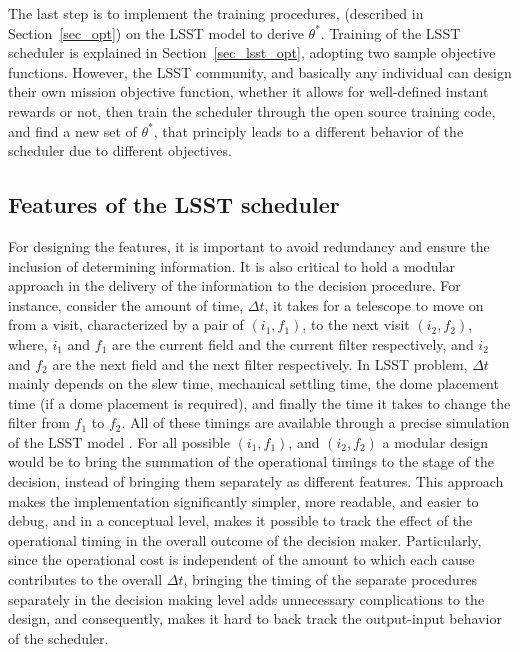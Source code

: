 \documentclass[12pt]{aastex62}
\theoremstyle{definition}
\begin{document}
The last step is to implement the training procedures, (described in Section~\ref{sec_opt}) on the LSST model to derive $\theta^*$. Training of the LSST scheduler is explained in Section~\ref{sec_lsst_opt}, adopting two sample objective functions. However, the LSST community, and basically any individual can design their own mission objective function, whether it allows for well-defined instant rewards or not, then train the scheduler through the open source training code, and find a new set of $\theta^*$, that principly leads to a different behavior of the scheduler due to different objectives.


\subsection{Features of the LSST scheduler}\label{sec_lsst_features}

For designing the features, it is important to avoid redundancy and ensure the inclusion of determining information. It is also critical to hold a modular approach in the delivery of the information to the decision procedure. For instance, consider the amount of time, $\Delta t$, it takes for a telescope to move on from a visit, characterized by a pair of $(i_1,f_1)$, to the next visit $(i_2,f_2)$,  where, $i_1$ and $f_1$ are the current field and the current filter respectively, and $i_2$ and $f_2$ are the next field and the next filter respectively. In LSST problem, $\Delta t$ mainly depends on the slew time, mechanical settling time, the dome placement time (if a dome placement is required), and finally the time it takes to change the filter from $f_1$ to $f_2$. All of these timings are available through a precise simulation of the LSST model \citep{delgado2014lsst}. For all possible $(i_1,f_1)$, and $(i_2,f_2)$ a modular design would be to bring the summation of the operational timings to the stage of the decision, instead of bringing them separately as different features. This approach makes the implementation significantly simpler, more readable, and easier to debug, and in a conceptual level, makes it possible to track the effect of the operational timing in the overall outcome of the decision maker. Particularly, since the operational cost is independent of the amount to which each cause contributes to the overall $\Delta t$, bringing the timing of the separate procedures separately in the decision making level adds unnecessary complications to the design, and consequently, makes it hard to back track the output-input behavior of the scheduler. 
\end{document}

